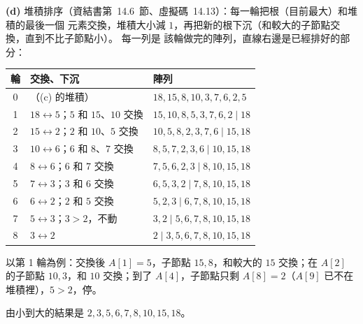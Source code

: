 \begin{pastsoln}
\textbf{(d)} 堆積排序（資結書第~14.6~節、虛擬碼~14.13）：每一輪把根（目前最大）和堆積的最後一個
元素交換，堆積大小減 $1$，再把新的根下沉（和較大的子節點交換，直到不比子節點小）。 每一列是
該輪做完的陣列，直線右邊是已經排好的部分：
\begin{center}
\begin{tabular}{cll}
\toprule
輪 & 交換、下沉 & 陣列 \\
\midrule
0 & （(c) 的堆積） & $18, 15, 8, 10, 3, 7, 6, 2, 5$ \\
1 & $18 \leftrightarrow 5$；$5$ 和 $15$、$10$ 交換 & $15, 10, 8, 5, 3, 7, 6, 2 \mid 18$ \\
2 & $15 \leftrightarrow 2$；$2$ 和 $10$、$5$ 交換 & $10, 5, 8, 2, 3, 7, 6 \mid 15, 18$ \\
3 & $10 \leftrightarrow 6$；$6$ 和 $8$、$7$ 交換 & $8, 5, 7, 2, 3, 6 \mid 10, 15, 18$ \\
4 & $8 \leftrightarrow 6$；$6$ 和 $7$ 交換 & $7, 5, 6, 2, 3 \mid 8, 10, 15, 18$ \\
5 & $7 \leftrightarrow 3$；$3$ 和 $6$ 交換 & $6, 5, 3, 2 \mid 7, 8, 10, 15, 18$ \\
6 & $6 \leftrightarrow 2$；$2$ 和 $5$ 交換 & $5, 2, 3 \mid 6, 7, 8, 10, 15, 18$ \\
7 & $5 \leftrightarrow 3$；$3 > 2$，不動 & $3, 2 \mid 5, 6, 7, 8, 10, 15, 18$ \\
8 & $3 \leftrightarrow 2$ & $2 \mid 3, 5, 6, 7, 8, 10, 15, 18$ \\
\bottomrule
\end{tabular}
\end{center}
以第 1 輪為例：交換後 $A[1] = 5$，子節點 $15, 8$，和較大的 $15$ 交換；在 $A[2]$ 的子節點
$10, 3$，和 $10$ 交換；到了 $A[4]$，子節點只剩 $A[8] = 2$（$A[9]$ 已不在堆積裡），$5 > 2$，停。

由小到大的結果是 $2, 3, 5, 6, 7, 8, 10, 15, 18$。
\end{pastsoln}
